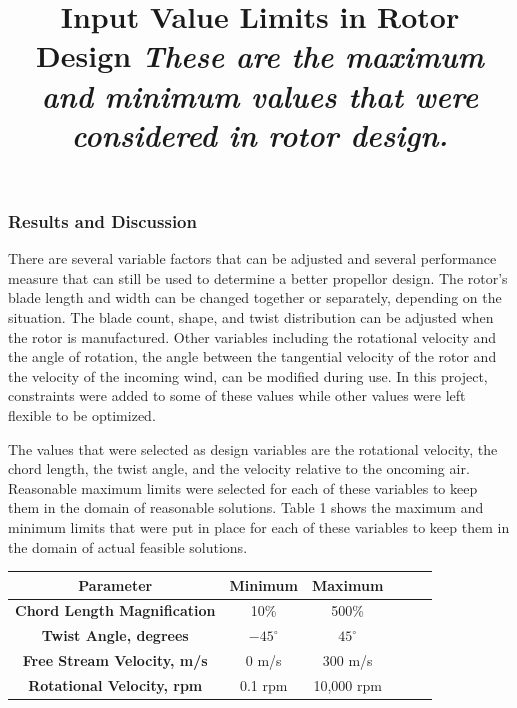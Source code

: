 \documentclass{article}
\begin{document}
\subsubsection*{Results and Discussion}







There are several variable factors that can be adjusted and several performance measure that can still be used to determine a better propellor design. The rotor's blade length and width can be changed together or separately, depending on the situation. The blade count, shape, and twist distribution can be adjusted when the rotor is manufactured. Other variables including the rotational velocity and the angle of rotation, the angle between the tangential velocity of the rotor and the velocity of the incoming wind, can be modified during use. In this project, constraints were added to some of these values while other values were left flexible to be optimized. \newline

The values that were selected as design variables are the rotational velocity, the chord length, the twist angle, and the velocity relative to the oncoming air. Reasonable maximum limits were selected for each of these variables to keep them in the domain of reasonable solutions. Table 1 shows the maximum and minimum limits that were put in place for each of these variables to keep them in the domain of actual feasible solutions. \newline

\begin{table}[bp]
	\centering
	\title{Input Value Limits in Rotor Design \newline}
	\title{\emph{These are the maximum and minimum values that were considered in rotor design.}} \label{table:1} \newline
	\begin{tabular}{| c | c | c | c | c | c |}
		 \hline
		 \textbf{Parameter} & Minimum & Maximum \\ \hline
		 \textbf{Chord Length Magnification} & 10\% & 500\% \\ \newline
		 \textbf{Twist Angle, degrees} & $-45^{\circ}$ & $45^{\circ}$ \\ \newline
		 \textbf{Free Stream Velocity, m/s} & 0 m/s & 300 m/s \\ \newline
		 \textbf{Rotational Velocity, rpm} & 0.1 rpm & 10,000 rpm \\ \hline
	\end{tabular}
\end{table}
\end{document}
